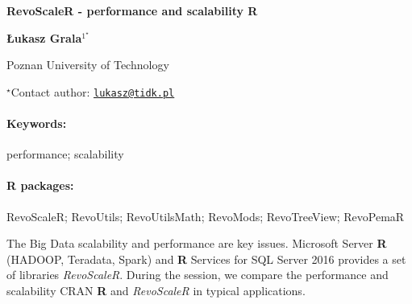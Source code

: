 \documentclass[11pt, a4paper]{article}
\renewcommand{\title}[1]{\begin{center}{\bf \LARGE #1}\end{center}}
\newcommand{\keywords}{\paragraph{Keywords:}}
\newcommand{\packages}{\paragraph{R packages:}}
\begin{document}
\pagestyle{empty}

\title{RevoScaleR - performance and scalability R}

\begin{center}
  {\bf Łukasz Grala$^{1^\star}$}
\end{center}

\vskip 0.3cm

\begin{affiliations}
\begin{enumerate}
\begin{minipage}{0.915\textwidth}
\centering
\item Poznan University of Technology \\[-2pt]
\end{minipage}
\end{enumerate}
$^\star$Contact author: \href{mailto:lukasz@tidk.pl}{\nolinkurl{lukasz@tidk.pl}}\\
\end{affiliations}

\vskip 0.5cm

\begin{minipage}{0.915\textwidth}
\keywords performance; scalability
\packages RevoScaleR; RevoUtils; RevoUtilsMath; RevoMods; RevoTreeView; RevoPemaR
\end{minipage}

\vskip 0.8cm

The Big Data scalability and performance are key issues. Microsoft
Server \textbf{R} (HADOOP, Teradata, Spark) and \textbf{R} Services for
SQL Server 2016 provides a set of libraries \emph{RevoScaleR}. During
the session, we compare the performance and scalability CRAN \textbf{R}
and \emph{RevoScaleR} in typical applications.
\end{document}
